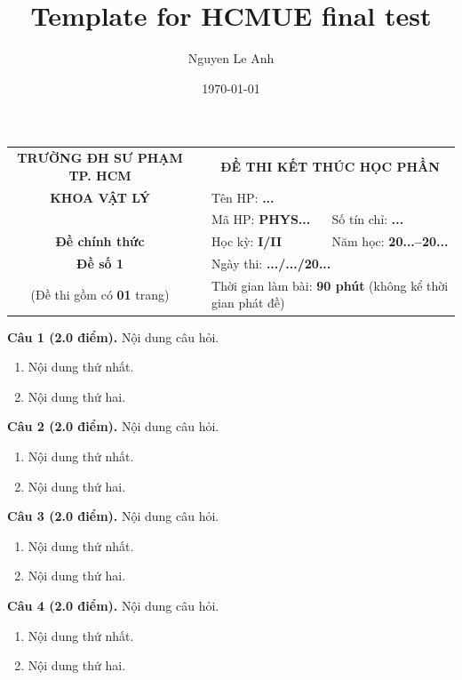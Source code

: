 \documentclass[12pt,a4paper]{exam}
\title{Template for HCMUE final test}
\author{Nguyen Le Anh}
\date{\today}
\begin{document}
\pagestyle{empty}

\begin{longtable}{p{4cm}p{0.5cm}p{4cm}p{4cm}}
\multicolumn{1}{c}{\bf TRƯỜNG ĐH SƯ PHẠM TP. HCM} & &  \multicolumn{2}{c}{\bf ĐỀ THI KẾT THÚC HỌC PHẦN}\\

\multicolumn{1}{c}{\bf KHOA VẬT LÝ} & & \multicolumn{2}{l}{Tên HP: {\bf ...}} \\

& &  \multicolumn{1}{l}{Mã HP: {\bf PHYS...}} &  \multicolumn{1}{l}{Số tín chỉ: {\bf ...}}\\

\multicolumn{1}{c}{\bf Đề chính thức} & & \multicolumn{1}{l}{Học kỳ: {\bf I/II}} & \multicolumn{1}{l}{Năm học: {\bf 20...--20...}}\\

\multicolumn{1}{c}{\bf Đề số 1} & & \multicolumn{2}{l}{Ngày thi: \textbf{.../.../20...}} \\

\multicolumn{1}{c}{(Đề thi gồm có {\bf 01} trang)} & & \multicolumn{2}{l}{Thời gian làm bài: {\bf 90 phút} (không kể thời gian phát đề)}\\
\end{longtable}

\vspace*{1.0cm}

{\bf Câu 1 (2.0 điểm).} Nội dung câu hỏi.
\begin{enumerate}[label=\alph*.]
\item Nội dung thứ nhất.
\item Nội dung thứ hai.
\end{enumerate}

{\bf Câu 2 (2.0 điểm).} Nội dung câu hỏi.
\begin{enumerate}[label=\alph*.]
\item Nội dung thứ nhất.
\item Nội dung thứ hai.
\end{enumerate}

{\bf Câu 3 (2.0 điểm).} Nội dung câu hỏi.
\begin{enumerate}[label=\alph*.]
\item Nội dung thứ nhất.
\item Nội dung thứ hai.
\end{enumerate}

{\bf Câu 4 (2.0 điểm).} Nội dung câu hỏi.
\begin{enumerate}[label=\alph*.]
\item Nội dung thứ nhất.
\item Nội dung thứ hai.
\end{enumerate}
\end{document}
